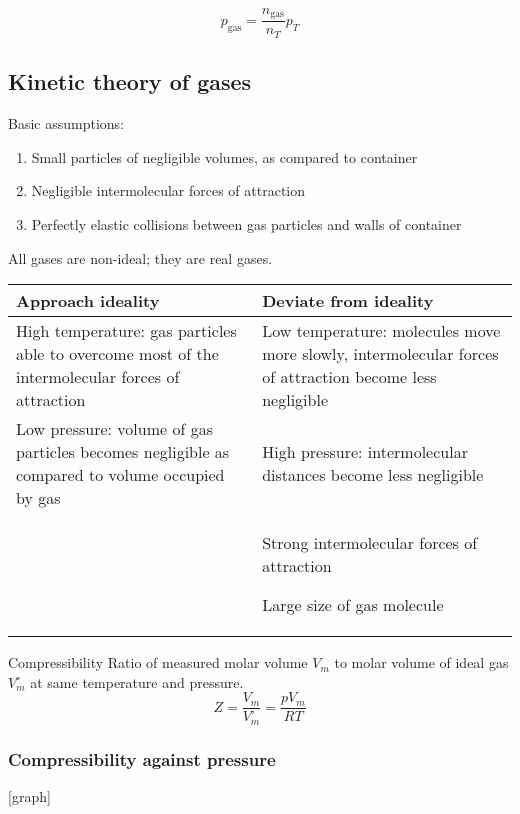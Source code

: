 \begin{equation}
p_\text{gas} = \frac{n_\text{gas}}{n_T}p_T
\end{equation}

\subsection{Kinetic theory of gases}
Basic assumptions:
\begin{enumerate}
\item Small particles of negligible volumes, as compared to container
\item Negligible intermolecular forces of attraction
\item Perfectly elastic collisions between gas particles and walls of container
\end{enumerate}

All gases are non-ideal; they are real gases.
\begin{table}[H]
\centering
\begin{tabular}{p{7.5cm}p{7.5cm}}
\hline\hline
\textbf{Approach ideality} & \textbf{Deviate from ideality} \\
\hline
High temperature: gas particles able to overcome most of the intermolecular forces of attraction & Low temperature: molecules move more slowly, intermolecular forces of attraction become less negligible \\
\hline
Low pressure: volume of gas particles becomes negligible as compared to volume occupied by gas & High pressure: intermolecular distances become less negligible \\
\hline
& Strong intermolecular forces of attraction

Large size of gas molecule \\
\hline\hline
\end{tabular}
\end{table}

\begin{defn}{Compressibility}{}
Ratio of measured molar volume $V_m$ to molar volume of ideal gas $V_m^\circ$ at same temperature and pressure.
\begin{equation}
Z = \frac{V_m}{V_m^\circ} = \frac{pV_m}{RT}
\end{equation}
\end{defn}

\subsubsection{Compressibility against pressure}
[graph]

